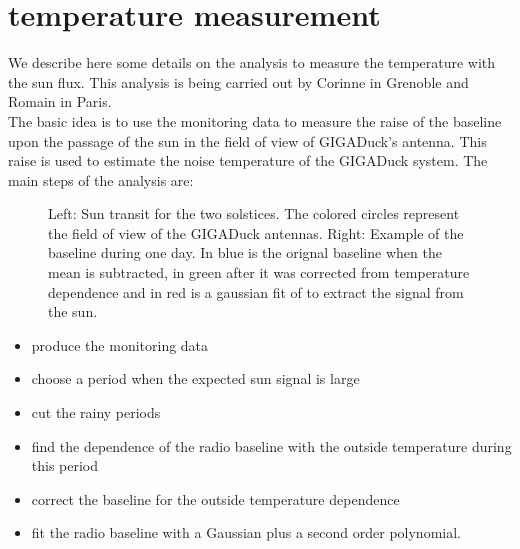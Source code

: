 \section{temperature measurement}
\label{sec:tempmeas}
We  describe  here  some  details  on  the  analysis  to  measure  the
temperature with the  sun flux. This analysis is  being carried out by
Corinne in Grenoble  and Romain in Paris. \\ The basic  idea is to use
the  monitoring data to  measure the  raise of  the baseline  upon the
passage of  the sun in the  field of view of  GIGADuck's antenna. This
raise  is used  to  estimate  the noise  temperature  of the  GIGADuck
system. The main steps of the analysis are:


\begin{figure}[!ht]
 \centering
 \hspace*{-3ex}
 \caption{Left: Sun transit for the two solstices. The colored circles
   represent  the field  of  view of  the  GIGADuck antennas.   Right:
   Example  of the  baseline during  one  day. In  blue is  the
   orignal baseline when the mean is subtracted, in green after it was
   corrected from temperature dependence and  in red is a gaussian fit
   of to extract the signal from the sun.}
 \label{fig:sunsim}
\end{figure}


\begin{itemize}
\item produce the monitoring data
\item choose a period when the expected sun signal is large
\item cut the rainy periods
\item  find the  dependence of  the  radio baseline  with the  outside
  temperature during this period
\item correct the baseline for the outside temperature dependence
\item  fit the  radio baseline  with a  Gaussian plus  a  second order
  polynomial.
\end{itemize}




